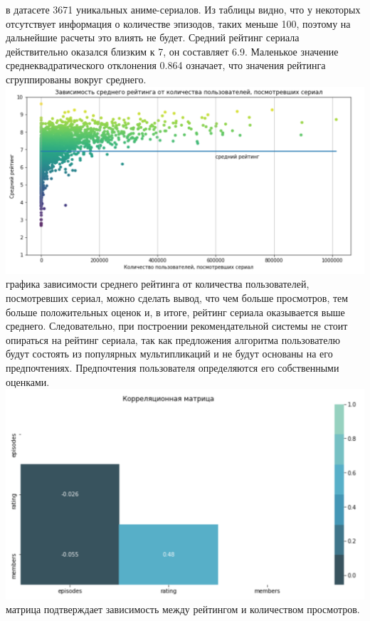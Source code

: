 \documentclass{article}
\newcommand\tab[1][1cm]{\hspace*{#1}}
\begin{document}
 в датасете 3671 уникальных аниме-сериалов. Из таблицы видно, что у некоторых отсутствует информация о количестве эпизодов, таких меньше 100, поэтому на дальнейшие расчеты это влиять не будет. Средний рейтинг сериала действительно оказался близким к 7, он составляет 6.9. Маленькое значение среднеквадратического отклонения 0.864 означает, что значения рейтинга сгруппированы вокруг среднего.\\
\includegraphics[scale=0.7]{f6.png}\\
 графика зависимости среднего рейтинга от количества пользователей, посмотревших сериал, можно сделать вывод, что чем больше просмотров, тем больше положительных оценок и, в итоге, рейтинг сериала оказывается выше среднего. Следовательно, при построении рекомендательной системы не стоит опираться на рейтинг сериала, так как предложения алгоритма пользователю будут состоять из популярных мультипликаций и не будут основаны на его предпочтениях. Предпочтения пользователя определяются его собственными оценками.\\
\includegraphics[scale=0.6]{f7.png}\\
 матрица подтверждает зависимость между рейтингом и количеством просмотров.\\
\end{document}
